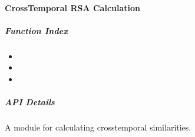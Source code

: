 \documentclass[letterpaper,10pt,english]{sphinxhowto}
\begin{document}
\sphinxstepscope

\clearpage


\paragraph{Cross\sphinxhyphen{}Temporal RSA Calculation}
\label{\detokenize{ctcorr_cal:cross-temporal-rsa-calculation}}\label{\detokenize{ctcorr_cal::doc}}
\sphinxAtStartPar
{}


\subparagraph{Function Index}
\label{\detokenize{ctcorr_cal:function-index}}\begin{itemize}
\item {} 
\sphinxAtStartPar
{}

\item {} 
\sphinxAtStartPar
{}

\item {} 
\sphinxAtStartPar
{}

\end{itemize}


\subparagraph{API Details}
\label{\detokenize{ctcorr_cal:module-neurora.ctcorr_cal}}\label{\detokenize{ctcorr_cal:api-details}}
\sphinxAtStartPar
A module for calculating cross\sphinxhyphen{}temporal similarities.
\end{document}
